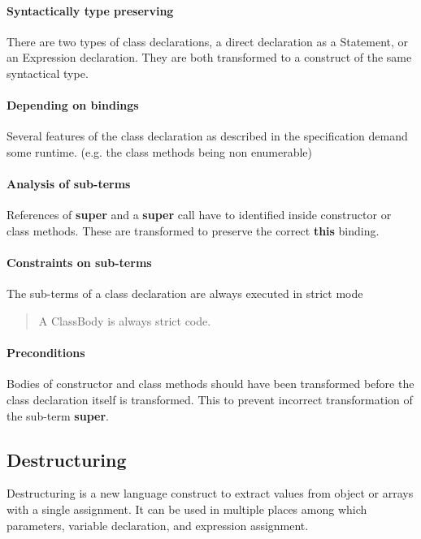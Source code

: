 \documentclass[10pt,a4paper]{article}
\begin{document}
\paragraph{Syntactically type preserving}
There are two types of class declarations, a direct declaration as a Statement, or an Expression declaration. They are both transformed to a construct of the same syntactical type.

\paragraph{Depending on bindings}
Several features of the class declaration as described in the specification demand some runtime. (e.g. the class methods being non enumerable)

\paragraph{Analysis of sub-terms}
References of \textbf{super} and a \textbf{super} call have to identified inside constructor or class methods. These are transformed to preserve the correct \textbf{this} binding.

\paragraph{Constraints on sub-terms}
The sub-terms of a class declaration are always executed in strict mode

\blockquote[{\cite[14.5]{SpecJS}}]{A ClassBody is always strict code.}

\paragraph{Preconditions}
Bodies of constructor and class methods should have been transformed before the class declaration itself is transformed. This to prevent incorrect transformation of the sub-term \textbf{super}.

\subsection{Destructuring}
Destructuring\cite[12.14.5]{SpecJS} is a new language construct to extract values from object or arrays with a single assignment. It can be used in multiple places among which parameters, variable declaration, and expression assignment.
\end{document}
